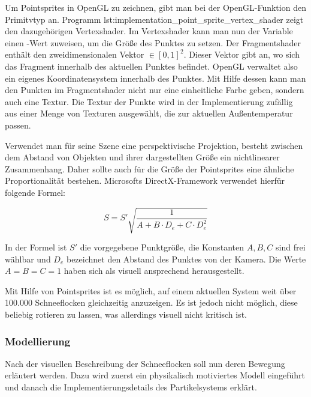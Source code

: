 Um Pointsprites in OpenGL zu zeichnen, gibt man bei der OpenGL-Funktion
 den Primitvtyp
 an. Programm lst:implementation_point_sprite_vertex_shader zeigt den dazugehörigen Vertexshader. Im Vertexshader kann man nun der
Variable  einen
-Wert zuweisen, um die Größe des Punktes zu
setzen. Der Fragmentshader enthält den zweidimensionalen Vektor
 $\in [0,1]^2$. Dieser Vektor gibt an,
wo sich das Fragment innerhalb des aktuellen Punktes befindet. OpenGL
verwaltet also ein eigenes Koordinatensystem innerhalb des
Punktes. Mit Hilfe dessen kann man den Punkten im Fragmentshader nicht
nur eine einheitliche Farbe geben, sondern auch eine Textur. Die
Textur der Punkte wird in der Implementierung zufällig aus einer Menge
von Texturen ausgewählt, die zur aktuellen Außentemperatur passen.

Verwendet man für seine Szene eine perspektivische Projektion, besteht
zwischen dem Abstand von Objekten und ihrer dargestellten Größe ein
nichtlinearer Zusammenhang. Daher sollte auch für die Größe der
Pointsprites eine ähnliche Proportionalität bestehen. Microsofts
DirectX-Framework verwendet hierfür folgende
Formel\cite{DirectXPointSprites}:

\begin{equation}
S =
S'
\sqrt{
  \frac
  {
    1
  }
  {
    A +
    B \cdot D_e +
    C \cdot D_e^2
  }
}
\end{equation}

In der Formel ist $S'$ die vorgegebene Punktgröße, die Konstanten
$A,B,C$ sind frei wählbar und $D_e$ bezeichnet den Abstand des Punktes
von der Kamera. Die Werte $A=B=C=1$ haben sich als visuell ansprechend
herausgestellt.

Mit Hilfe von Pointsprites ist es möglich, auf einem aktuellen System
weit über 100.000 Schneeflocken gleichzeitig anzuzeigen. Es ist jedoch
nicht möglich, diese beliebig rotieren zu lassen, was allerdings
visuell nicht kritisch ist.

\subsubsection{Modellierung}

Nach der visuellen Beschreibung der Schneeflocken soll nun deren
Bewegung erläutert werden. Dazu wird zuerst ein physikalisch
motiviertes Modell eingeführt und danach die Implementierungsdetails
des Partikelsystems erklärt.



